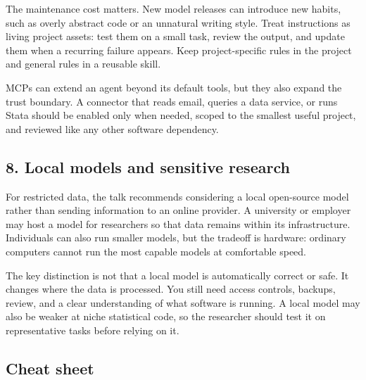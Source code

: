 \documentclass[
  english,
  10pt,
]{article}
\begin{document}
The maintenance cost matters. New model releases can introduce new
habits, such as overly abstract code or an unnatural writing style.
Treat instructions as living project assets: test them on a small task,
review the output, and update them when a recurring failure appears.
Keep project-specific rules in the project and general rules in a
reusable skill.

MCPs can extend an agent beyond its default tools, but they also expand
the trust boundary. A connector that reads email, queries a data
service, or runs Stata should be enabled only when needed, scoped to the
smallest useful project, and reviewed like any other software
dependency.

\subsection{8. Local models and sensitive
research}\label{local-models-and-sensitive-research}

For restricted data, the talk recommends considering a local open-source
model rather than sending information to an online provider. A
university or employer may host a model for researchers so that data
remains within its infrastructure. Individuals can also run smaller
models, but the tradeoff is hardware: ordinary computers cannot run the
most capable models at comfortable speed.

The key distinction is not that a local model is automatically correct
or safe. It changes where the data is processed. You still need access
controls, backups, review, and a clear understanding of what software is
running. A local model may also be weaker at niche statistical code, so
the researcher should test it on representative tasks before relying on
it.

\subsection{Cheat sheet}\label{cheat-sheet}
\end{document}
